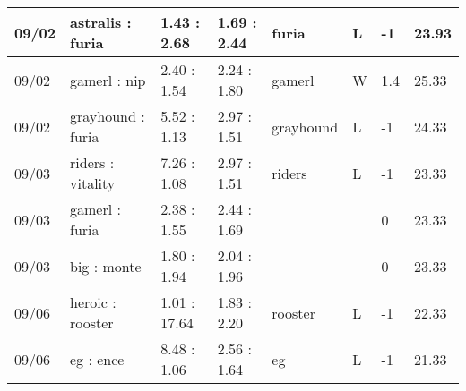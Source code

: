 \begin{small}
\begin{longtable}{|l|l|l|l|l|l|l|l|}
	09/02                               & astralis : furia                    & 1.43 : 2.68                             & 1.69 : 2.44                             & furia                             & L                                 & -1                                   & 23.93                             \\ \hline
	09/02                               & gamerl : nip                        & 2.40 : 1.54                             & 2.24 : 1.80                             & gamerl                            & W                                 & 1.4                                  & 25.33                             \\ \hline
	09/02                               & grayhound : furia                   & 5.52 : 1.13                             & 2.97 : 1.51                             & grayhound                         & L                                 & -1                                   & 24.33                             \\ \hline
	09/03                               & riders : vitality                   & 7.26 : 1.08                             & 2.97 : 1.51                             & riders                            & L                                 & -1                                   & 23.33                             \\ \hline
	09/03                               & gamerl : furia                      & 2.38 : 1.55                             & 2.44 : 1.69                             &                                   &                                   & 0                                    & 23.33                             \\ \hline
	09/03                               & big : monte                         & 1.80 : 1.94                             & 2.04 : 1.96                             &                                   &                                   & 0                                    & 23.33                             \\ \hline
	09/06                               & heroic : rooster                    & 1.01 : 17.64                            & 1.83 : 2.20                             & rooster                           & L                                 & -1                                   & 22.33                             \\ \hline
	09/06                               & eg : ence                           & 8.48 : 1.06                             & 2.56 : 1.64                             & eg                                & L                                 & -1                                   & 21.33                             \\ \hline

\end{longtable}
\end{small}
